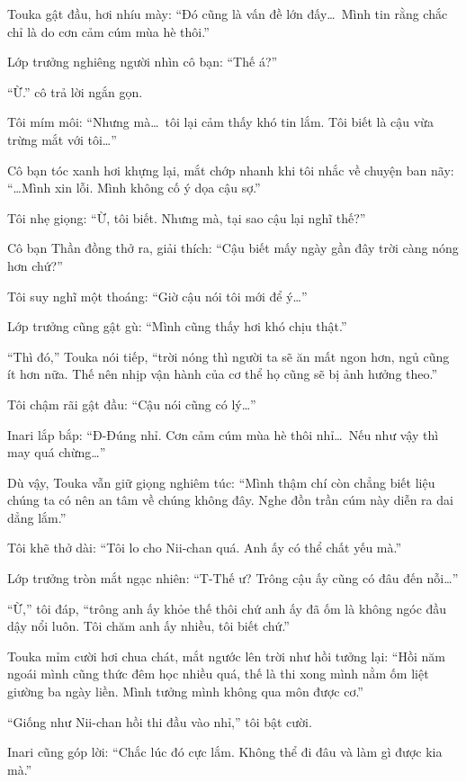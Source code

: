 \documentclass[../main.tex]{subfiles}
\begin{document}
Touka gật đầu, hơi nhíu mày: ``Đó cũng là vấn đề lớn đấy\dots\ Mình tin rằng chắc chỉ là do cơn cảm cúm mùa hè thôi.''

Lớp trưởng nghiêng người nhìn cô bạn: ``Thế á?''

``Ừ.'' cô trả lời ngắn gọn.

Tôi mím môi: ``Nhưng mà\dots\ tôi lại cảm thấy khó tin lắm. Tôi biết là cậu vừa trừng mắt với tôi\dots''

Cô bạn tóc xanh hơi khựng lại, mắt chớp nhanh khi tôi nhắc về chuyện ban nãy: ``\dots Mình xin lỗi. Mình không cố ý dọa cậu sợ.''

Tôi nhẹ giọng: ``Ừ, tôi biết. Nhưng mà, tại sao cậu lại nghĩ thế?''

Cô bạn Thần đồng thở ra, giải thích: ``Cậu biết mấy ngày gần đây trời càng nóng hơn chứ?''

Tôi suy nghĩ một thoáng: ``Giờ cậu nói tôi mới để ý\dots''

Lớp trưởng cũng gật gù: ``Mình cũng thấy hơi khó chịu thật.''

``Thì đó,'' Touka nói tiếp, ``trời nóng thì người ta sẽ ăn mất ngon hơn, ngủ cũng ít hơn nữa. Thế nên nhịp vận hành của cơ thể họ cũng sẽ bị ảnh hưởng theo.''

Tôi chậm rãi gật đầu: ``Cậu nói cũng có lý\dots''

Inari lắp bắp: ``Đ-Đúng nhỉ. Cơn cảm cúm mùa hè thôi nhỉ\dots\ Nếu như vậy thì may quá chừng\dots''

Dù vậy, Touka vẫn giữ giọng nghiêm túc: ``Mình thậm chí còn chẳng biết liệu chúng ta có nên an tâm về chúng không đây. Nghe đồn trần cúm này diễn ra dai dẳng lắm.''

Tôi khẽ thở dài: ``Tôi lo cho Nii-chan quá. Anh ấy có thể chất yếu mà.''

Lớp trưởng tròn mắt ngạc nhiên: ``T-Thế ư? Trông cậu ấy cũng có đâu đến nỗi\dots''

``Ừ,'' tôi đáp, ``trông anh ấy khỏe thế thôi chứ anh ấy đã ốm là không ngóc đầu dậy nổi luôn. Tôi chăm anh ấy nhiều, tôi biết chứ.''

Touka mỉm cười hơi chua chát, mắt ngước lên trời như hồi tưởng lại: ``Hồi năm ngoái mình cũng thức đêm học nhiều quá, thế là thi xong mình nằm ốm liệt giường ba ngày liền. Mình tưởng mình không qua môn được cơ.''

``Giống như Nii-chan hồi thi đầu vào nhỉ,'' tôi bật cười.

Inari cũng góp lời: ``Chắc lúc đó cực lắm. Không thể đi đâu và làm gì được kia mà.''
\end{document}
